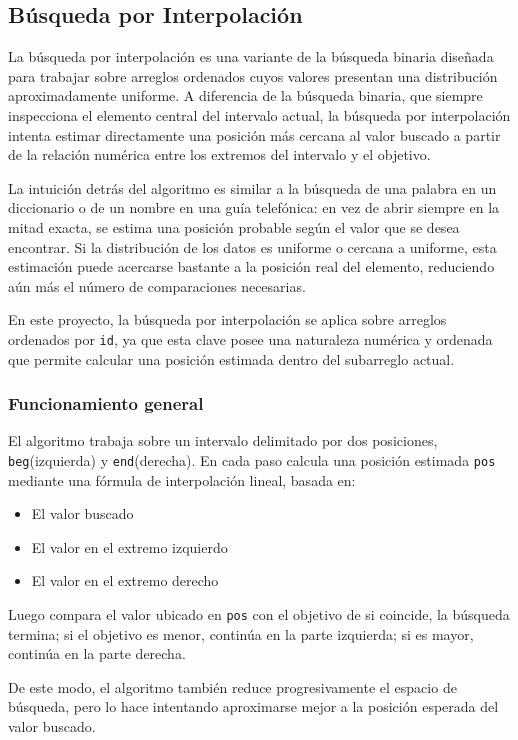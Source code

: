 \subsection{Búsqueda por Interpolación}\label{sec:interpolacion}
La búsqueda por interpolación es una variante de la búsqueda binaria diseñada para trabajar sobre arreglos ordenados cuyos valores presentan una distribución aproximadamente uniforme. A diferencia de la búsqueda binaria, que siempre inspecciona el elemento central del intervalo actual, la búsqueda por interpolación intenta estimar directamente una posición más cercana al valor buscado a partir de la relación numérica entre los extremos del intervalo y el objetivo.

La intuición detrás del algoritmo es similar a la búsqueda de una palabra en un diccionario o de un nombre en una guía telefónica: en vez de abrir siempre en la mitad exacta, se estima una posición probable según el valor que se desea encontrar. Si la distribución de los datos es uniforme o cercana a uniforme, esta estimación puede acercarse bastante a la posición real del elemento, reduciendo aún más el número de comparaciones necesarias.

En este proyecto, la búsqueda por interpolación se aplica sobre arreglos ordenados por \texttt{id}, ya que esta clave posee una naturaleza numérica y ordenada que permite calcular una posición estimada dentro del subarreglo actual.

\subsubsection{Funcionamiento general}
El algoritmo trabaja sobre un intervalo delimitado por dos posiciones, \texttt{beg}(izquierda) y \texttt{end}(derecha). En cada paso calcula una posición estimada \texttt{pos} mediante una fórmula de interpolación lineal, basada en:
\begin{itemize}
    \item El valor buscado
    \item El valor en el extremo izquierdo
    \item El valor en el extremo derecho
\end{itemize}
Luego compara el valor ubicado en \texttt{pos} con el objetivo de si coincide, la búsqueda termina; si el objetivo es menor, continúa en la parte izquierda; si es mayor, continúa en la parte derecha.

De este modo, el algoritmo también reduce progresivamente el espacio de búsqueda, pero lo hace intentando aproximarse mejor a la posición esperada del valor buscado.

